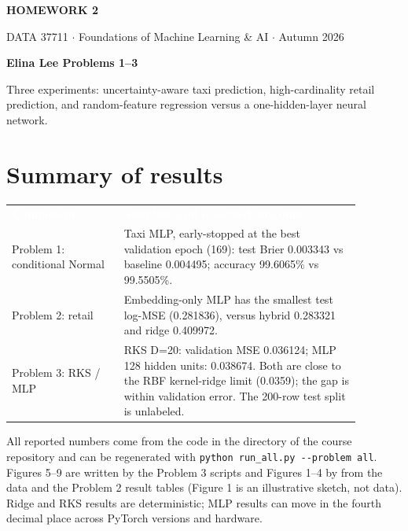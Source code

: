 \documentclass[10pt,letterpaper]{article}
\begin{document}
{\fontsize{21}{23}\selectfont\bfseries\color{navy} HOMEWORK 2}\par
{\small\color{muted} DATA 37711 $\cdot$ Foundations of Machine Learning \& AI $\cdot$ Autumn 2026}\par
\vspace{3pt}
\textbf{Elina Lee \textbar{} Problems 1--3}

Three experiments: uncertainty-aware taxi prediction, high-cardinality
retail prediction, and random-feature regression versus a
one-hidden-layer neural network.

\section{Summary of results}\label{summary-of-results}

\begin{center}
\begingroup
\small
\setlength{\tabcolsep}{4pt}
\renewcommand{\arraystretch}{1.18}
\begin{tabular}{>{\raggedright\arraybackslash}p{0.290\linewidth}>{\raggedright\arraybackslash}p{0.590\linewidth}}
\rowcolor{navy}
\textcolor{white}{\textbf{Component}} & \textcolor{white}{\textbf{Selection and observed outcome}} \\
Problem 1: conditional Normal & Taxi MLP, early-stopped at the best validation epoch (169): test Brier 0.003343 vs baseline 0.004495; accuracy 99.6065\% vs 99.5505\%. \\
Problem 2: retail & Embedding-only MLP has the smallest test log-MSE (0.281836), versus hybrid 0.283321 and ridge 0.409972. \\
Problem 3: RKS / MLP & RKS D=20: validation MSE 0.036124; MLP 128 hidden units: 0.038674. Both are close to the RBF kernel-ridge limit (0.0359); the gap is within validation error. The 200-row test split is unlabeled. \\
\end{tabular}
\endgroup
\end{center}

All reported numbers come from the code in the 
directory of the course repository and can be regenerated with
\texttt{python run\_all.py -{}-problem all}. Figures 5--9 are written by
the Problem 3 scripts and Figures 1--4 by 
from the data and the Problem 2 result tables (Figure 1 is an
illustrative sketch, not data). Ridge and RKS
results are deterministic; MLP results can move in the fourth decimal
place across PyTorch versions and hardware.
\end{document}
